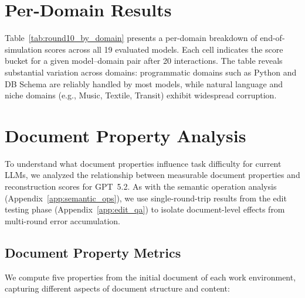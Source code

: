 \documentclass{article} %
\begin{document}
\section{Per-Domain Results} \label{app:per_domain_results}

Table~\ref{tab:round10_by_domain} presents a per-domain breakdown of end-of-simulation scores across all 19 evaluated models. Each cell indicates the score bucket for a given model--domain pair after 20 interactions. The table reveals substantial variation across domains: programmatic domains such as Python and DB Schema are reliably handled by most models, while natural language and niche domains (e.g., Music, Textile, Transit) exhibit widespread corruption.

\begin{table}[h!]

\caption{Visual histogram of end of simulation scores (after 20 interactions), broken down across the 52 domains in \benchmark{}. Scores are binned into buckets: 
 (``\textit{ready}'')\;
\;
\;
\;
\;
\;
. Catastrophic corruption (80 and below) occurs in more than 80\% of model, domain combinations. Python is the only domain where a majority of models achieve the ready status, and the best model (Gemini 3.1 Pro) is ready for delegated workflows in only 11 out of 52 domains.}
\label{tab:round10_by_domain}
\end{table}


\section{Document Property Analysis} \label{app:domain_chars}

To understand what document properties influence task difficulty for current LLMs, we analyzed the relationship between measurable document properties and reconstruction scores for GPT~5.2. As with the semantic operation analysis (Appendix~\ref{app:semantic_ops}), we use single-round-trip results from the edit testing phase (Appendix~\ref{app:edit_qa}) to isolate document-level effects from multi-round error accumulation.

\subsection{Document Property Metrics}

We compute five properties from the initial document of each work environment, capturing different aspects of document structure and content:
\end{document}
